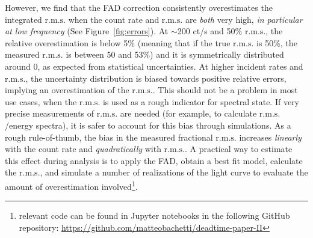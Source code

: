 \documentclass[twocolumn]{aastex61}
\newcommand{\rms}{\ensuremath{\mathrm{r.m.s.}}\xspace}
\begin{document}
However, we find that the FAD correction consistently overestimates the integrated \rms when the count rate and \rms are \textit{both} very high, \textit{in particular at low frequency} (See Figure~\ref{fig:errors}).
At $\sim$200 ct/s and 50\% \rms, the relative overestimation is below 5\% (meaning that if the true \rms is 50\%, the measured \rms is between 50 and 53\%) and it is symmetrically distributed around 0, as expected from statistical uncertainties. 
At higher incident rates and \rms, the uncertainty distribution is biased towards positive relative errors, implying an overestimation of the \rms. 
This should not be a problem in most use cases, when the \rms is used as a rough indicator for spectral state.
If very precise measurements of \rms are needed (for example, to calculate \rms/energy spectra), it is safer to account for this bias through simulations.
As a rough rule-of-thumb, the bias in the measured fractional \rms increases \textit{linearly} with the count rate and \textit{quadratically} with \rms.
A practical way to estimate this effect during analysis is to apply the FAD, obtain a best fit model, calculate the \rms, and simulate a number of realizations of the light curve to evaluate the amount of overestimation involved\footnote{relevant code can be found in Jupyter notebooks in the following GitHub repository: \href{https://github.com/matteobachetti/deadtime-paper-II}{https://github.com/matteobachetti/deadtime-paper-II}}.
\end{document}
